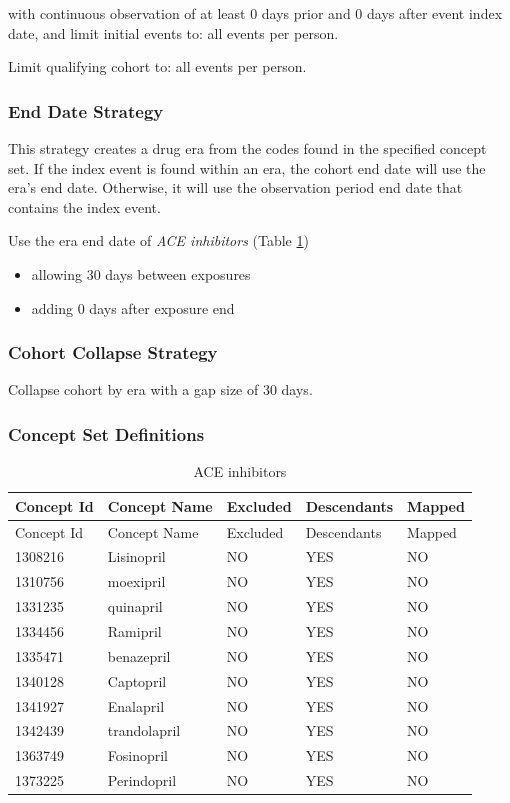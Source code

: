 \documentclass[11pt]{book}
\providecommand{\tightlist}{%
  \setlength{\itemsep}{0pt}\setlength{\parskip}{0pt}}
\theoremstyle{definition}
\theoremstyle{definition}
\theoremstyle{definition}
\theoremstyle{remark}
\begin{document}
with continuous observation of at least 0 days prior and 0 days after
event index date, and limit initial events to: all events per person.

Limit qualifying cohort to: all events per person.

\subsubsection*{End Date Strategy}\label{end-date-strategy-6}

This strategy creates a drug era from the codes found in the specified
concept set. If the index event is found within an era, the cohort end
date will use the era's end date. Otherwise, it will use the observation
period end date that contains the index event.

Use the era end date of \emph{ACE inhibitors} (Table
\ref{tab:ACEiUseACE})

\begin{itemize}
\tightlist
\item
  allowing 30 days between exposures
\item
  adding 0 days after exposure end
\end{itemize}

\subsubsection*{Cohort Collapse
Strategy}\label{cohort-collapse-strategy-6}

Collapse cohort by era with a gap size of 30 days.

\subsubsection*{Concept Set
Definitions}\label{concept-set-definitions-6}

\begin{longtable}[]{@{}lllll@{}}
\caption{\label{tab:ACEiUseACE} ACE inhibitors}\tabularnewline
\toprule
Concept Id & Concept Name & Excluded & Descendants &
Mapped\tabularnewline
\midrule
\endfirsthead
\toprule
Concept Id & Concept Name & Excluded & Descendants &
Mapped\tabularnewline
\midrule
\endhead
1308216 & Lisinopril & NO & YES & NO\tabularnewline
1310756 & moexipril & NO & YES & NO\tabularnewline
1331235 & quinapril & NO & YES & NO\tabularnewline
1334456 & Ramipril & NO & YES & NO\tabularnewline
1335471 & benazepril & NO & YES & NO\tabularnewline
1340128 & Captopril & NO & YES & NO\tabularnewline
1341927 & Enalapril & NO & YES & NO\tabularnewline
1342439 & trandolapril & NO & YES & NO\tabularnewline
1363749 & Fosinopril & NO & YES & NO\tabularnewline
1373225 & Perindopril & NO & YES & NO\tabularnewline
\bottomrule
\end{longtable}
\end{document}
